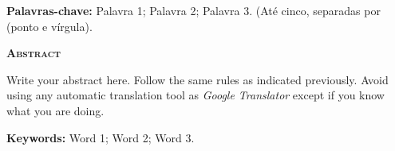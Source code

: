 {\vspace*{0.5cm}
\noindent\textbf{Palavras-chave:} Palavra 1; Palavra 2; Palavra 3. (Até cinco, separadas por \q{ ; } (ponto e vírgula).

\newpage
\pagestyle{empty}
\begin{center}
    \textbf{\textsc{Abstract}}
\end{center}
\SingleSpacing\noindent
    Write your abstract here. Follow the same rules as indicated previously. Avoid using any automatic translation tool as \textit{Google Translator} except if you know what you are doing.

\vspace*{0.5cm}
\noindent\textbf{Keywords:} Word 1; Word 2; Word 3.
}
\newpage
\tableofcontents*
\thispagestyle{empty}
\newpage\listoffigures*
\thispagestyle{empty}
\newpage\listoftables*
\thispagestyle{empty}